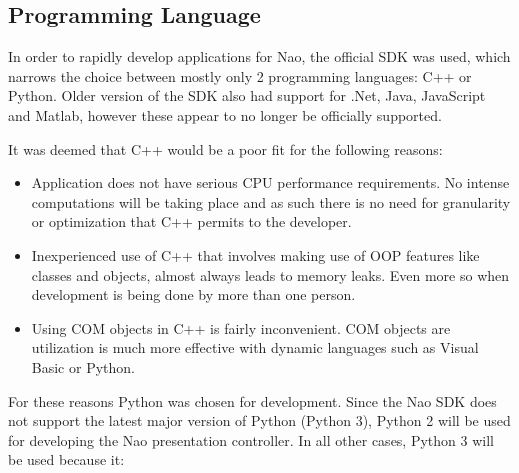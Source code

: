 \documentclass[12pt, fleqn, a4paper]{article}
\begin{document}
\subsection{Programming Language}
In order to rapidly develop applications for Nao, the official SDK was used, which narrows the choice between mostly only 2 programming languages: C++ or Python. Older version of the SDK also had support for .Net, Java, JavaScript and Matlab, however these appear to no longer be officially supported.\par
It was deemed that C++ would be a poor fit for the following reasons:
\begin{itemize}
	\item Application does not have serious CPU performance requirements. No intense computations will be taking place and as such there is no need for granularity or optimization that C++ permits to the developer.
	\item Inexperienced use of C++ that involves making use of OOP features like classes and objects, almost always leads to memory leaks. Even more so when development is being done by more than one person.
	\item Using COM objects in C++ is fairly inconvenient. COM objects are utilization is much more effective with dynamic languages such as Visual Basic or Python.
\end{itemize}
For these reasons Python was chosen for development. Since the Nao SDK does not support the latest major version of Python (Python 3), Python 2 will be used for developing the Nao presentation controller. 
In all other cases, Python 3 will be used because it:
\end{document}
